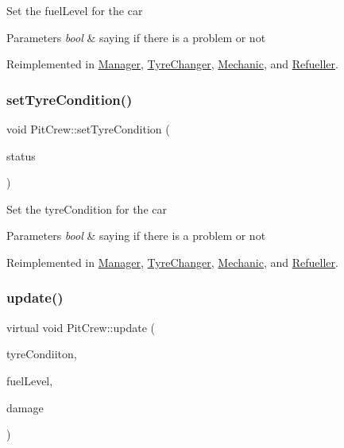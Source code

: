 Set the fuel\+Level for the car 
\begin{DoxyParams}{Parameters}
{\em bool} & saying if there is a problem or not \\
\hline
\end{DoxyParams}


Reimplemented in \mbox{\hyperlink{class_manager_a14c804ff23b09be331842d3db9cbbbe1}{Manager}}, \mbox{\hyperlink{class_tyre_changer_a22ba050947a3cea4372fc574d6fae910}{Tyre\+Changer}}, \mbox{\hyperlink{class_mechanic_aadcc0312af851bd03361aec4744881ee}{Mechanic}}, and \mbox{\hyperlink{class_refueller_a8b8eb7429509e858a3787e1a58aa9db0}{Refueller}}.

\mbox{\label{class_pit_crew_a281583ec0986aeec56fc70dd362fa31c}} 
\subsubsection{\texorpdfstring{set\+Tyre\+Condition()}{setTyreCondition()}}
{\footnotesize\ttfamily void Pit\+Crew\+::set\+Tyre\+Condition (\begin{DoxyParamCaption}\item[{bool $\ast$}]{status }\end{DoxyParamCaption})\hspace{0.3cm}{\ttfamily [virtual]}}

Set the tyre\+Condition for the car 
\begin{DoxyParams}{Parameters}
{\em bool} & saying if there is a problem or not \\
\hline
\end{DoxyParams}


Reimplemented in \mbox{\hyperlink{class_manager_a94c18f89371ffb2af29a14f67cde55de}{Manager}}, \mbox{\hyperlink{class_tyre_changer_a1a0df7cbe3bd488bdc54fd1e14fefd1b}{Tyre\+Changer}}, \mbox{\hyperlink{class_mechanic_a9ca7c0e50fe3bdc27f9f8f2273968ddc}{Mechanic}}, and \mbox{\hyperlink{class_refueller_a7260c4594e1def9110d293186a9dc14c}{Refueller}}.

\mbox{\label{class_pit_crew_a575e63653226346422eb2c2f8020d95d}} 
\subsubsection{\texorpdfstring{update()}{update()}}
{\footnotesize\ttfamily virtual void Pit\+Crew\+::update (\begin{DoxyParamCaption}\item[{bool $\ast$}]{tyre\+Condiiton,  }\item[{bool}]{fuel\+Level,  }\item[{bool}]{damage }\end{DoxyParamCaption})\hspace{0.3cm}{\ttfamily [pure virtual]}}

